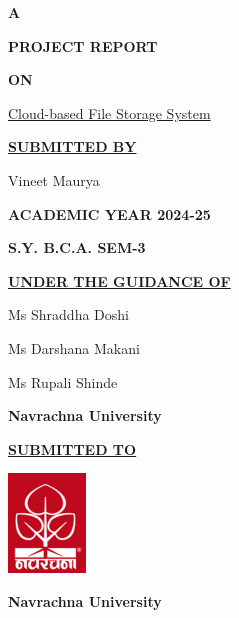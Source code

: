 \documentclass[12pt,a4paper]{report}
\begin{document}
\afterpage{\restorepagecolor}
\begin{titlepage}
	\onehalfspacing
	\setlength{\baselineskip}{18pt}
	\color{white}
	\begin{center}
		\textbf{\LARGE{A}}

		\textbf{\LARGE{PROJECT REPORT}}

		\textbf{\LARGE{ON}}

		\Large{\underline{Cloud-based File Storage System}}
		\vspace{1cm}

		\textbf{\underline{SUBMITTED BY}}

		Vineet Maurya
		\vspace{1cm}

		\textbf{ACADEMIC YEAR 2024-25}


		\textbf{S.Y. B.C.A. SEM-3}
		\vspace{1cm}

		\textbf{\underline{UNDER THE GUIDANCE OF}}

		Ms Shraddha Doshi

		Ms Darshana Makani

		Ms Rupali Shinde

		\textbf{Navrachna University}
		\vspace{1cm}

		\textbf{\underline{SUBMITTED TO}}
		\vspace{0.5cm}

		\includegraphics{nuv_logo.png}
		\vspace{0.5cm}

		\textbf{Navrachna University}
	\end{center}
\end{titlepage}
\newpage
\onehalfspacing
\setlength{\baselineskip}{18pt}
\color{black}
\end{document}
